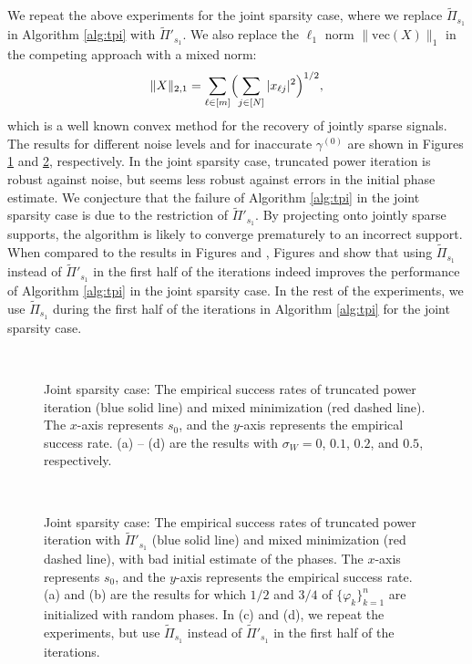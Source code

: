 \documentclass[11pt,journal]{IEEEtran}
\newcommand{\norm}[1]{\|{#1}\|}
\newcommand{\vect}{\mathrm{vec}}
\begin{document}
We repeat the above experiments for the joint sparsity case, where we replace $\widetilde{\Pi}_{s_1}$ in Algorithm \ref{alg:tpi} with $\widetilde{\Pi}'_{s_1}$. We also replace the $\ell_1$ norm $\norm{\vect(X)}_1$ in the competing approach with a mixed norm:
\[
\norm{X}_{2,1} = \sum_{\ell\in[m]} \Bigl( \sum_{j\in[N]} |x_{\ell j}|^2 \Bigr)^{1/2},
\]
which is a well known convex method for the recovery of jointly sparse signals. The results for different noise levels and for inaccurate $\gamma^{(0)}$ are shown in Figures \ref{fig:jsparsity} and \ref{fig:js_wrong_phase}, respectively. In the joint sparsity case, truncated power iteration is robust against noise, but seems less robust against errors in the initial phase estimate. We conjecture that the failure of Algorithm \ref{alg:tpi} in the joint sparsity case is due to the restriction of $\widetilde{\Pi}'_{s_1}$. By projecting onto jointly sparse supports, the algorithm is likely to converge prematurely to an incorrect support. When compared to the results in Figures  and , Figures  and  show that using $\widetilde{\Pi}_{s_1}$ instead of $\widetilde{\Pi}'_{s_1}$ in the first half of the iterations indeed improves the performance of Algorithm \ref{alg:tpi} in the joint sparsity case. In the rest of the experiments, we use $\widetilde{\Pi}_{s_1}$ during the first half of the iterations in Algorithm \ref{alg:tpi} for the joint sparsity case.

\begin{figure}[htbp]%
\centering
\subfloat[]{
\label{fig:jsparsity_a}}
\subfloat[]{
\label{fig:jsparsity_b}}
\\
\subfloat[]{
\label{fig:jsparsity_c}}
\subfloat[]{
\label{fig:jsparsity_d}}
\caption{Joint sparsity case: The empirical success rates of truncated power iteration (blue solid line) and mixed minimization (red dashed line). The $x$-axis represents $s_0$, and the $y$-axis represents the empirical success rate. (a) -- (d) are the results with $\sigma_W=0$, $0.1$, $0.2$, and $0.5$, respectively.}%
\label{fig:jsparsity}%
\end{figure}

\begin{figure}[htbp]%
\centering
\subfloat[]{
\label{fig:jwp_a}}
\subfloat[]{
\label{fig:jwp_b}}
\\
\subfloat[]{
\label{fig:jwp_c}}
\subfloat[]{
\label{fig:jwp_d}}
\caption{Joint sparsity case: The empirical success rates of truncated power iteration with $\widetilde{\Pi}'_{s_1}$ (blue solid line) and mixed minimization (red dashed line), with bad initial estimate of the phases. The $x$-axis represents $s_0$, and the $y$-axis represents the empirical success rate. (a) and (b) are the results for which $1/2$ and $3/4$ of $\{\varphi_k\}_{k=1}^n$ are initialized with random phases. In (c) and (d), we repeat the experiments, but use $\widetilde{\Pi}_{s_1}$ instead of $\widetilde{\Pi}'_{s_1}$ in the first half of the iterations.}%
\label{fig:js_wrong_phase}%
\end{figure}
\end{document}
